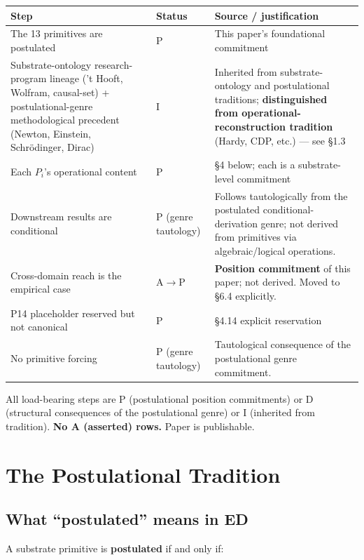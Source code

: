 \documentclass[11pt,a4paper]{article}
\begin{document}
\begin{center}
\footnotesize
\begin{tabular}{p{}p{}p{}}
\toprule
\textbf{Step} & \textbf{Status} & \textbf{Source / justification} \\
\midrule
The 13 primitives are postulated & P & This paper's foundational commitment \\
Substrate-ontology research-program lineage ('t Hooft, Wolfram, causal-set) + postulational-genre methodological precedent (Newton, Einstein, Schr\"odinger, Dirac) & I & Inherited from substrate-ontology and postulational traditions; \textbf{distinguished from operational-reconstruction tradition} (Hardy, CDP, etc.) --- see \S1.3 \\
Each $P_i$'s operational content & P & \S4 below; each is a substrate-level commitment \\
Downstream results are conditional & P (genre tautology) & Follows tautologically from the postulated conditional-derivation genre; not derived from primitives via algebraic/logical operations. \\
Cross-domain reach is the empirical case & A$\to$P & \textbf{Position commitment} of this paper; not derived. Moved to \S6.4 explicitly. \\
P14 placeholder reserved but not canonical & P & \S4.14 explicit reservation \\
No primitive forcing & P (genre tautology) & Tautological consequence of the postulational genre commitment. \\
\bottomrule
\end{tabular}
\end{center}

All load-bearing steps are P (postulational position commitments) or D (structural consequences of the postulational genre) or I (inherited from tradition). \textbf{No A (asserted) rows.} Paper is publishable.

\section{The Postulational Tradition}

\subsection{What ``postulated'' means in ED}

A substrate primitive is \textbf{postulated} if and only if:
\end{document}
